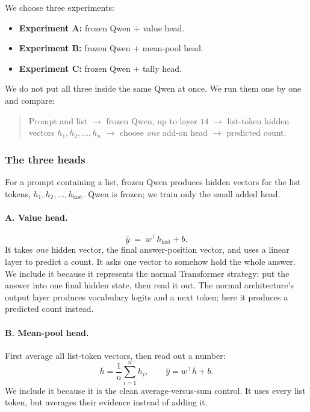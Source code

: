 \documentclass[10pt]{article}
\theoremstyle{definition}
\begin{document}
We choose three experiments:
\begin{itemize}
\item \textbf{Experiment A:} frozen Qwen $+$ value head.
\item \textbf{Experiment B:} frozen Qwen $+$ mean-pool head.
\item \textbf{Experiment C:} frozen Qwen $+$ tally head.
\end{itemize}
We do not put all three inside the same Qwen at once. We run them one by
one and compare:

\begin{quote}
Prompt and list $\rightarrow$ frozen Qwen, up to layer $14$ $\rightarrow$
list-token hidden vectors $h_1, h_2, \dots, h_n$ $\rightarrow$ choose
\emph{one} add-on head $\rightarrow$ predicted count.
\end{quote}

\subsubsection*{The three heads}

For a prompt containing a list, frozen Qwen produces hidden vectors for
the list tokens, $h_1, h_2, \dots, h_{\text{last}}$. Qwen is frozen; we
train only the small added head.

\paragraph{A. Value head.}
\begin{equation}
\hat{y} \;=\; w^{\top} h_{\text{last}} + b .
\label{eq:valuehead}
\end{equation}
It takes \emph{one} hidden vector, the final answer-position vector, and
uses a linear layer to predict a count. It asks one vector to somehow
hold the whole answer. We include it because it represents the normal
Transformer strategy: put the answer into one final hidden state, then
read it out. The normal architecture's output layer produces vocabulary
logits and a next token; here it produces a predicted count instead.

\paragraph{B. Mean-pool head.}
First average all list-token vectors, then read out a number:
\begin{equation}
\bar{h} = \frac{1}{n}\sum_{i=1}^{n} h_i,
\qquad
\hat{y} = w^{\top}\bar{h} + b .
\label{eq:meanpool}
\end{equation}
We include it because it is the clean average-versus-sum control. It uses
every list token, but averages their evidence instead of adding it.
\end{document}
